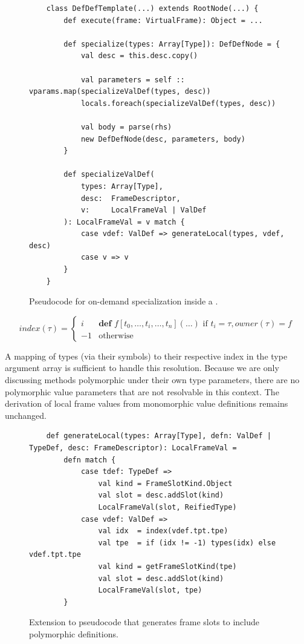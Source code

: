 \begin{figure}[!htb]
	\begin{verbatim}
	class DefDefTemplate(...) extends RootNode(...) {
		def execute(frame: VirtualFrame): Object = ...
			
		def specialize(types: Array[Type]): DefDefNode = {
			val desc = this.desc.copy()
				
			val parameters = self :: vparams.map(specializeValDef(types, desc))
			locals.foreach(specializeValDef(types, desc))
				
			val body = parse(rhs)
			new DefDefNode(desc, parameters, body)
		}
	
		def specializeValDef(
			types: Array[Type], 
			desc:  FrameDescriptor, 
			v:     LocalFrameVal | ValDef
		): LocalFrameVal = v match {
			case vdef: ValDef => generateLocal(types, vdef, desc)
			case v => v
		}
	}
	\end{verbatim}
	\caption{Pseudocode for on-demand specialization inside a .}
	\label{impl:defdeftemplate-specialize}
\end{figure}

$$
index(\tau) = 
\begin{cases}
	i  & \textbf{def } f[t_0, \ldots, t_i, \ldots, t_n](\ldots) \text{ if } t_i = \tau, owner(\tau)=f \\
	-1 & \text{otherwise}
\end{cases}
$$

A mapping of types (via their symbols) to their respective index in the type argument array is sufficient to handle this resolution.
Because we are only discussing methods polymorphic under their own type parameters, there are no polymorphic value parameters that are not resolvable in this context.
The derivation of local frame values from monomorphic value definitions remains unchanged. 

\begin{figure}[!htb]
	\begin{verbatim}
	def generateLocal(types: Array[Type], defn: ValDef | TypeDef, desc: FrameDescriptor): LocalFrameVal = 
		defn match {
			case tdef: TypeDef => 
				val kind = FrameSlotKind.Object
				val slot = desc.addSlot(kind)
				LocalFrameVal(slot, ReifiedType)
			case vdef: ValDef => 
				val idx  = index(vdef.tpt.tpe)
				val tpe  = if (idx != -1) types(idx) else vdef.tpt.tpe
				val kind = getFrameSlotKind(tpe)
				val slot = desc.addSlot(kind)
				LocalFrameVal(slot, tpe)
		}
	\end{verbatim}
	\caption{Extension to pseudocode that generates frame slots to include polymorphic definitions.}
	\label{impl:gen-poly-locals}
\end{figure}

